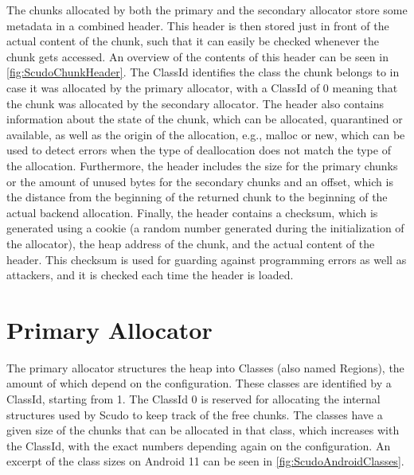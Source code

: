 \documentclass[a4paper,11pt,oneside]{report}
\begin{document}
The chunks allocated by both the primary and the secondary allocator store some
metadata in a combined header. This header is then stored just in front of the
actual content of the chunk, such that it can easily be checked whenever the
chunk gets accessed. An overview of the contents of this header can be seen
in \autoref{fig:ScudoChunkHeader}. The ClassId identifies the class the chunk
belongs to in case it was allocated by the primary allocator, with a ClassId
of 0 meaning that the chunk was allocated by the secondary allocator. The
header also contains information about the state of the chunk, which can be
allocated, quarantined or available, as well as the origin of the allocation,
e.g., malloc or new, which can be used to detect errors when the type of
deallocation does not match the type of the allocation. Furthermore, the
header includes the size for the primary chunks or the amount of unused bytes
for the secondary chunks and an offset, which is the distance from the beginning
of the returned chunk to the beginning of the actual backend allocation.
Finally, the header contains a checksum, which is generated using a cookie (a
random number generated during the initialization of the allocator), the heap
address of the chunk, and the actual content of the header. This checksum is
used for guarding against programming errors as well as attackers, and it is
checked each time the header is loaded.

\section{Primary Allocator}


The primary allocator structures the heap into Classes (also named Regions), the
amount of which depend on the configuration. These classes are identified by a
ClassId, starting from 1. The ClassId 0 is reserved for allocating the internal
structures used by Scudo to keep track of the free chunks.
The classes have a given size of the chunks that can be allocated in that class,
which increases with the ClassId, with the exact numbers depending again on the
configuration. An excerpt of the class sizes on Android 11 can be seen in
\autoref{fig:ScudoAndroidClasses}.
\end{document}
